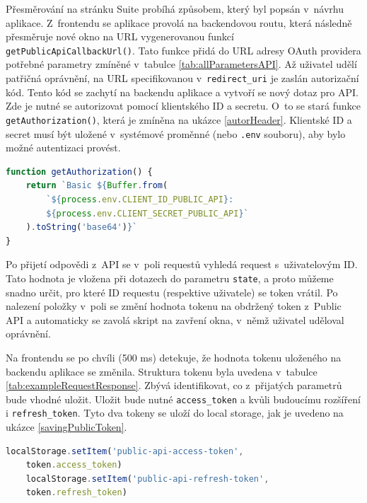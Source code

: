 \documentclass[czech, bc, kiv, he, iso690numb, viewonly]{fasthesis} %
\begin{document}
Přesměrování na stránku Suite probíhá způsobem, který byl popsán v~návrhu aplikace. Z~frontendu se aplikace provolá na backendovou routu, která následně přesměruje nové okno
na URL vygenerovanou funkcí \texttt{getPublicApiCallbackUrl()}. Tato funkce přidá do URL adresy OAuth providera potřebné parametry zmíněné v~tabulce \ref{tab:allParametersAPI}.
Až uživatel udělí patřičná oprávnění, na URL specifikovanou v~\texttt{redirect\_uri} je zaslán autorizační kód. Tento kód se zachytí na backendu aplikace a
vytvoří se nový dotaz pro API. Zde je nutné se autorizovat pomocí klientského ID a secretu. O~to se stará funkce \texttt{getAuthorization()}, která je zmíněna na 
ukázce \ref{autorHeader}. Klientské ID a secret musí být uložené v~systémové proměnné (nebo \texttt{.env} souboru), aby bylo možné autentizaci provést.

\begin{lstlisting}[language=Javascript, caption={Vytvoření autorizační hlavičky pro následnou autentizaci}, label=autorHeader]
function getAuthorization() {
	return `Basic ${Buffer.from(
		`${process.env.CLIENT_ID_PUBLIC_API}:
		${process.env.CLIENT_SECRET_PUBLIC_API}`
	).toString('base64')}`
}
\end{lstlisting}

Po přijetí odpovědi z~API se v~poli requestů vyhledá request s~uživatelovým ID. Tato hodnota je vložena při dotazech do parametru \texttt{state}, a proto můžeme snadno
určit, pro které ID requestu (respektive uživatele) se token vrátil. Po nalezení položky v~poli se změní hodnota tokenu na obdržený token z~Public API a automaticky se
zavolá skript na zavření okna, v~němž uživatel uděloval oprávnění.

Na frontendu se po chvíli (500 ms) detekuje, že hodnota tokenu uloženého na backendu aplikace se změnila. Struktura tokenu byla uvedena v~tabulce \ref{tab:exampleRequestResponse}.
Zbývá identifikovat, co z~přijatých parametrů bude vhodné uložit. Uložit bude nutné \texttt{access\_token} a kvůli budoucímu rozšíření i \texttt{refresh\_token}. Tyto
dva tokeny se uloží do local storage, jak je uvedeno na ukázce \ref{savingPublicToken}.

\begin{lstlisting}[language=Javascript, caption={Ukládání Public API tokenů do local storage}, label=savingPublicToken]
	localStorage.setItem('public-api-access-token', 
	token.access_token)
	localStorage.setItem('public-api-refresh-token', 
	token.refresh_token)
\end{lstlisting}
\end{document}
